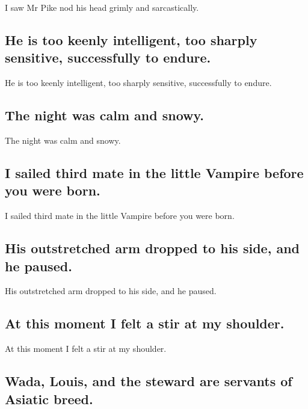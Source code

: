 \documentclass[]{article}
\begin{document}
I saw Mr Pike nod his head grimly and sarcastically.

\hypertarget{he-is-too-keenly-intelligent-too-sharply-sensitive-successfully-to-endure.}{%
\subsection{He is too keenly intelligent, too sharply sensitive,
successfully to
endure.}\label{he-is-too-keenly-intelligent-too-sharply-sensitive-successfully-to-endure.}}

He is too keenly intelligent, too sharply sensitive, successfully to
endure.

\hypertarget{the-night-was-calm-and-snowy.}{%
\subsection{The night was calm and
snowy.}\label{the-night-was-calm-and-snowy.}}

The night was calm and snowy.

\hypertarget{i-sailed-third-mate-in-the-little-vampire-before-you-were-born.}{%
\subsection{I sailed third mate in the little Vampire before you were
born.}\label{i-sailed-third-mate-in-the-little-vampire-before-you-were-born.}}

I sailed third mate in the little Vampire before you were born.

\hypertarget{his-outstretched-arm-dropped-to-his-side-and-he-paused.}{%
\subsection{His outstretched arm dropped to his side, and he
paused.}\label{his-outstretched-arm-dropped-to-his-side-and-he-paused.}}

His outstretched arm dropped to his side, and he paused.

\hypertarget{at-this-moment-i-felt-a-stir-at-my-shoulder.}{%
\subsection{At this moment I felt a stir at my
shoulder.}\label{at-this-moment-i-felt-a-stir-at-my-shoulder.}}

At this moment I felt a stir at my shoulder.

\hypertarget{wada-louis-and-the-steward-are-servants-of-asiatic-breed.}{%
\subsection{Wada, Louis, and the steward are servants of Asiatic
breed.}\label{wada-louis-and-the-steward-are-servants-of-asiatic-breed.}}
\end{document}
